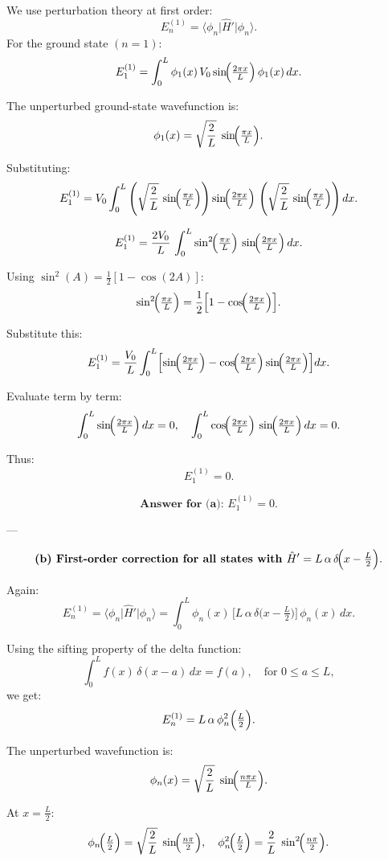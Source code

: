 \documentclass{article}
\begin{document}
We use perturbation theory at first order:
\[
E_n^{(1)} = \langle \phi_n \vert \hat{H}' \vert \phi_n \rangle.
\]
For the ground state \((n=1)\):
\[
E_1^{(1)} = \int_0^L \phi_1(x)\,V_0 \sin\!\Bigl(\tfrac{2\pi x}{L}\Bigr)\,\phi_1(x)\,dx.
\]

The unperturbed ground-state wavefunction is:
\[
\phi_1(x) = \sqrt{\frac{2}{L}}\;\sin\!\Bigl(\tfrac{\pi x}{L}\Bigr).
\]

Substituting:
\[
E_1^{(1)} = V_0 \int_0^L \left(\sqrt{\frac{2}{L}}\,\sin\!\Bigl(\tfrac{\pi x}{L}\Bigr)\right)
\sin\!\Bigl(\tfrac{2\pi x}{L}\Bigr)\,
\left(\sqrt{\frac{2}{L}}\,\sin\!\Bigl(\tfrac{\pi x}{L}\Bigr)\right)
dx.
\]

\[
E_1^{(1)} = \frac{2V_0}{L}\,\int_0^L \sin^2\!\Bigl(\tfrac{\pi x}{L}\Bigr)\,\sin\!\Bigl(\tfrac{2\pi x}{L}\Bigr)\,dx.
\]

Using \(\sin^2(A) = \frac{1}{2}[1 - \cos(2A)]\):
\[
\sin^2\!\Bigl(\tfrac{\pi x}{L}\Bigr) = \frac{1}{2}\Bigl[1 - \cos\!\Bigl(\tfrac{2\pi x}{L}\Bigr)\Bigr].
\]

Substitute this:
\[
E_1^{(1)} = \frac{V_0}{L} \int_0^L 
\Bigl[
\sin\!\Bigl(\tfrac{2\pi x}{L}\Bigr)
-
\cos\!\Bigl(\tfrac{2\pi x}{L}\Bigr)\sin\!\Bigl(\tfrac{2\pi x}{L}\Bigr)
\Bigr] dx.
\]

Evaluate term by term:
\[
\int_0^L \sin\!\Bigl(\tfrac{2\pi x}{L}\Bigr)\,dx = 0,
\quad
\int_0^L \cos\!\Bigl(\tfrac{2\pi x}{L}\Bigr)\,\sin\!\Bigl(\tfrac{2\pi x}{L}\Bigr)\,dx = 0.
\]

Thus:
\[
E_1^{(1)} = 0.
\]

\[
\textbf{Answer for (a): } E_1^{(1)} = 0.
\]

---

\[
\textbf{(b) First-order correction for all states with } \hat{H}' = L\,\alpha\,\delta\!\Bigl(x - \tfrac{L}{2}\Bigr).
\]

Again:
\[
E_n^{(1)} = \langle \phi_n \vert \hat{H}' \vert \phi_n \rangle 
= \int_0^L \phi_n(x)\,\bigl[L\,\alpha\,\delta\!\bigl(x - \tfrac{L}{2}\bigr)\bigr]\,\phi_n(x)\,dx.
\]

Using the sifting property of the delta function:
\[
\int_0^L f(x)\,\delta(x-a)\,dx = f(a), \quad \text{for } 0 \leq a \leq L,
\]
we get:
\[
E_n^{(1)} = L\,\alpha\,\phi_n^2\Bigl(\tfrac{L}{2}\Bigr).
\]

The unperturbed wavefunction is:
\[
\phi_n(x) = \sqrt{\frac{2}{L}}\;\sin\!\Bigl(\tfrac{n\pi x}{L}\Bigr).
\]

At \(x = \tfrac{L}{2}\):
\[
\phi_n\!\Bigl(\tfrac{L}{2}\Bigr) = \sqrt{\frac{2}{L}}\;\sin\!\Bigl(\tfrac{n\pi}{2}\Bigr),
\quad
\phi_n^2\!\Bigl(\tfrac{L}{2}\Bigr) = \frac{2}{L}\;\sin^2\!\Bigl(\tfrac{n\pi}{2}\Bigr).
\]
\end{document}

